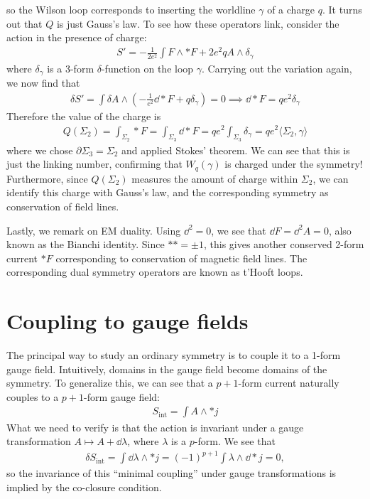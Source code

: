 \documentclass[11pt]{article}
\begin{document}
so the Wilson loop corresponds to inserting the worldline $\gamma$ of a charge
$q$. It turns out that $Q$ is just Gauss's law. To see how these operators link,
consider the action in the presence of charge:
\begin{align}
  S' = -\frac{1}{2e^2}\int F \wedge *F + 2e^2 q A \wedge \delta_\gamma
\end{align}
where $\delta_\gamma$ is a 3-form $\delta$-function on the loop $\gamma$.
Carrying out the variation again, we now find that
\begin{align}
  \delta S' = \int \delta A \wedge \left(-\frac{1}{e^2}\dd *F + q\delta_\gamma\right) = 0 \implies \dd * F = qe^2\delta_\gamma
\end{align}
Therefore the value of the charge is
\begin{align}
Q(\Sigma_2) = \int_{\Sigma_2} *F = \int_{\Sigma_3} \dd *F = qe^2\int_{\Sigma_3}\delta_\gamma = qe^2 \langle  \Sigma_2 , \gamma\rangle
\end{align}
where we chose $\partial \Sigma_3 = \Sigma_2$ and applied Stokes' theorem. We
can see that this is just the linking number, confirming that
$W_q(\gamma)$ is charged under the symmetry! Furthermore, since $Q(\Sigma_2)$
measures the amount of charge within $\Sigma_2$, we can identify this charge
with Gauss's law, and the corresponding symmetry as conservation of field lines.

Lastly, we remark on EM duality. Using $\dd^2 = 0$, we see that $\dd F = \dd^2A
= 0$, also known as the Bianchi identity. Since $** = \pm 1$, this gives another
conserved 2-form current $*F$ corresponding to conservation of magnetic field
lines. The corresponding dual symmetry operators are known as t'Hooft loops.

\section{Coupling to gauge fields}
The principal way to study an ordinary symmetry is to couple it to a 1-form
gauge field. Intuitively, domains in the gauge field become domains of the
symmetry. To generalize this, we can see that a $p+1$-form current naturally
couples to a $p+1$-form gauge field:
\begin{align}
  S_{\mathrm{int}} = \int A \wedge * j
\end{align}
What we need to verify is that the action is invariant under a gauge
transformation $A \mapsto A + \dd \lambda$, where $\lambda$ is a $p$-form. We
see that
\begin{align}
  \delta S_{\mathrm{int}} = \int \dd \lambda \wedge * j = (-1)^{p+1}\int \lambda \wedge \dd * j = 0,
\end{align}
so the invariance of this ``minimal coupling'' under gauge transformations is
implied by the co-closure condition.



\end{document}
